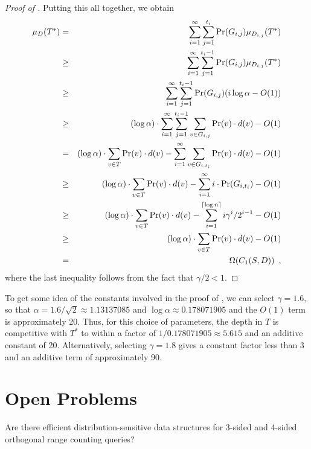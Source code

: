 \documentclass[charterfonts]{patmorin}
\newcommand{\depth}{d}
\begin{document}
\begin{proof}[Proof of ]
Putting this all together, we obtain
\begin{eqnarray*}
\mu_D(T^*) 
  & = & \sum_{i=1}^{\infty}\sum_{j=1}^{t_i}\Pr(G_{i,j})\mu_{D_{i,j}}(T^*) \\
  & \ge & \sum_{i=1}^{\infty}
    \sum_{j=1}^{t_i-1}\Pr(G_{i,j})\mu_{D_{i,j}}(T^*) \\
  & \ge & \sum_{i=1}^{\infty}\sum_{j=1}^{t_i-1}
           \Pr(G_{i,j})( i\log\alpha -O(1)) \\
  & \ge & (\log\alpha)\cdot
         \sum_{i=1}^{\infty}\sum_{j=1}^{t_i-1}
		\sum_{v\in G_{i,j}}\Pr(v)\cdot\depth(v) - O(1)\\
  & = & (\log\alpha)\cdot\sum_{v\in T}\Pr(v)\cdot \depth(v)
          -    \sum_{i=1}^{\infty}
		\sum_{v\in G_{i,t_i}}\Pr(v)\cdot\depth(v) - O(1)\\
  & \ge & (\log\alpha)\cdot\sum_{v\in T}\Pr(v)\cdot \depth(v)
          -    \sum_{i=1}^{\infty}i\cdot\Pr(G_{i,t_i}) - O(1) \\
  & \ge & (\log\alpha)\cdot\sum_{v\in T}\Pr(v)\cdot \depth(v)
          -    \sum_{i=1}^{\ceil{\log n}}i\gamma^i/2^{i-1} - O(1) \\
  & \ge &  (\log\alpha)\cdot\sum_{v\in T}\Pr(v)\cdot \depth(v) - O(1) \\
  & = & \Omega(C_1(S,D)) \enspace ,
\end{eqnarray*}
where the last inequality follows from the fact that $\gamma/2 < 1$. 
\end{proof}

To get some idea of the constants involved in the proof of
, we can select $\gamma=1.6$, so that
$\alpha=1.6/\sqrt{2}\approx 1.13137085$ and $\log \alpha \approx
0.178071905$ and the $O(1)$ term is approximately 20.  Thus, for this
choice of parameters, the depth in $T$ is competitive with $T^*$ to
within a factor of $1/0.178071905\approx 5.615$ and an additive
constant of 20.  Alternatively, selecting $\gamma=1.8$ gives a
constant factor less than 3 and an additive term of approximately 90.

\section{Open Problems}

\begin{op}
Are there efficient distribution-sensitive data structures for 3-sided
and 4-sided orthogonal range counting queries?
\end{op}
\end{document}
